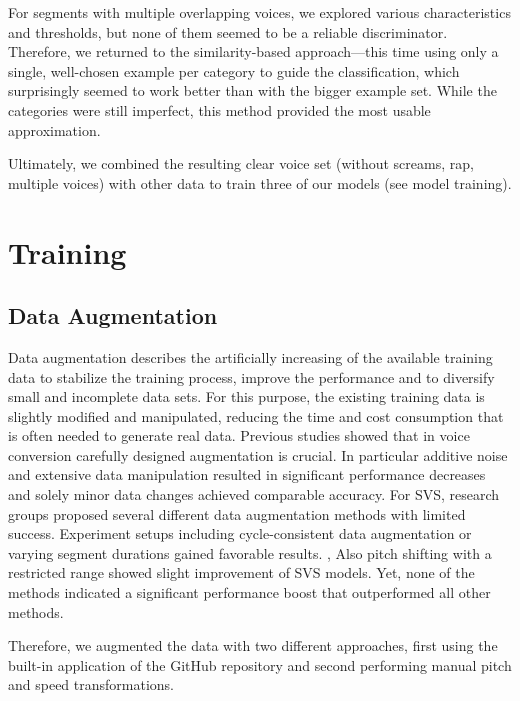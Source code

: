 \documentclass[a4paper]{article}
\begin{document}
	For segments with multiple overlapping voices, we explored various characteristics and thresholds, but none of them seemed to be a reliable discriminator. Therefore, we returned to the similarity-based approach—this time using only a single, well-chosen example per category to guide the classification, which surprisingly seemed to work better than with the bigger example set. While the categories were still imperfect, this method provided the most usable approximation.
	
	Ultimately, we combined the resulting clear voice set (without screams, rap, multiple voices) with other data to train three of our models (see model training).
	
	
	
	
	
	
	\section{Training}
	
	\subsection{Data Augmentation}
	
	Data augmentation describes the artificially increasing of the available training data to stabilize the training process, improve the performance and to diversify small and incomplete data sets. For this purpose, the existing training data is slightly modified and manipulated, reducing the  time and cost consumption that is often needed to generate real data. Previous studies showed that in voice conversion carefully designed augmentation is crucial. In particular additive noise and extensive data manipulation resulted in significant performance decreases and solely minor data changes achieved comparable accuracy. \cite{Slizovskaia2022}  For SVS, research groups proposed several different data augmentation methods with limited success. Experiment setups including cycle-consistent data augmentation or varying segment durations gained favorable results. \cite{Guo2022},\cite{Zhang2022} Also pitch shifting with a restricted range showed slight improvement of SVS models. \cite{Guo2022} Yet, none of the methods indicated a significant performance boost that outperformed all other methods. 
	
	Therefore, we augmented the data with two different approaches, first using the built-in application of the GitHub repository and second performing manual pitch and speed transformations.
	
\end{document}

